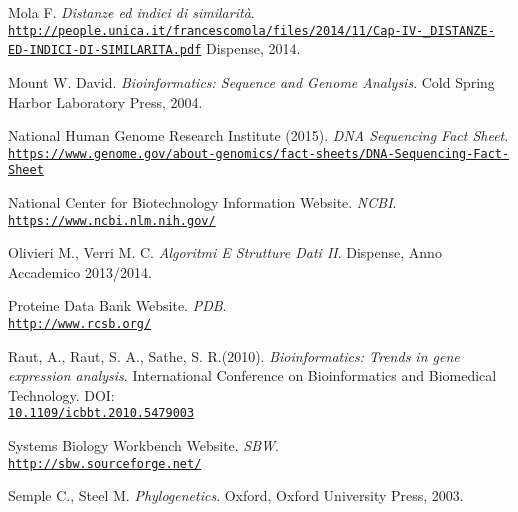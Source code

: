 \documentclass[twoside,openright,titlepage,fleqn,
,	headinclude,12pt,a4paper,BCOR5mm,footinclude,table]{scrbook}
\newcommand{\?}{'\-\nobreak\hspace{0pt}}
\begin{document}
\begin{thebibliography}{60}
Mola F.\newline
\textit{Distanze ed indici di similarità}.
\\\texttt{\url{http://people.unica.it/francescomola/files/2014/11/Cap-IV-_DISTANZE-ED-INDICI-DI-SIMILARITA.pdf}}\newline
Dispense, 2014.

Mount W. David.\newline
\textit{Bioinformatics: Sequence and Genome Analysis}.\newline
Cold Spring Harbor Laboratory Press, 2004.

National Human Genome Research Institute (2015).\newline
\textit{DNA Sequencing Fact Sheet}.
\\\texttt{\url{https://www.genome.gov/about-genomics/fact-sheets/DNA-Sequencing-Fact-Sheet}}

National Center for Biotechnology Information Website.\newline
\textit{NCBI}.
\\\texttt{\url{https://www.ncbi.nlm.nih.gov/}}

Olivieri M., Verri M. C.\newline
\textit{Algoritmi E Strutture Dati II}.\newline
Dispense, Anno Accademico 2013/2014.

Proteine Data Bank Website.\newline
\textit{PDB}.
\\\texttt{\url{http://www.rcsb.org/}}

Raut, A., Raut, S. A., Sathe, S. R.(2010). \newline
\textit{Bioinformatics: Trends in gene expression analysis}.\newline
International Conference on Bioinformatics and Biomedical Technology.\newline
DOI:\\\texttt{\url{10.1109/icbbt.2010.5479003}}

Systems Biology Workbench Website.\newline
\textit{SBW}.
\\\texttt{\url{http://sbw.sourceforge.net/}}

Semple C., Steel M.\newline
\textit{Phylogenetics}.\newline
Oxford, Oxford University Press, 2003.


\end{thebibliography}
\end{document}
